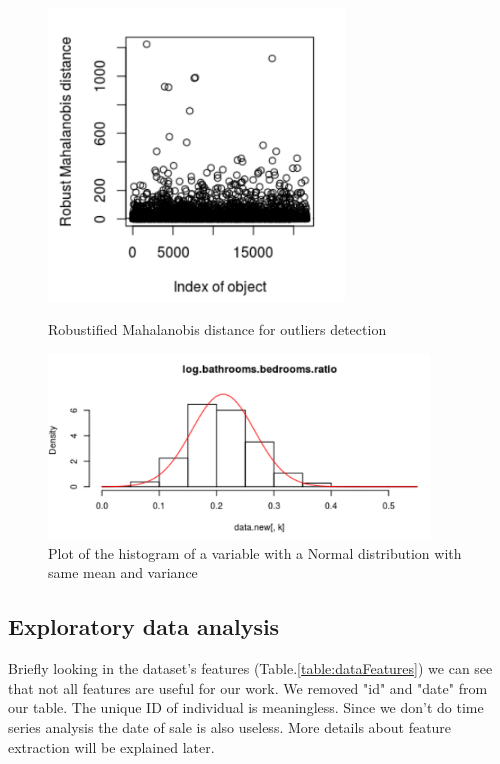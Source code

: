 \begin{figure}[H]
%
    \centering
        \includegraphics[width=0.7\textwidth]{img/mahalanobis.png}
    \caption{Robustified Mahalanobis distance for outliers detection }\label{mahalanobis}
\endminipage\hfill
{}%
    \centering
        \includegraphics[width=0.9\textwidth]{img/gauss01.png}
    \caption{Plot of the histogram of a variable with a Normal distribution with same mean and variance }\label{gauss01}
\endminipage
\end{figure}
\vspace*{-15pt}

\subsection{Exploratory data analysis}
Briefly looking in the dataset's features (Table.\ref{table:dataFeatures}) we can see that not all features are useful for our work. We removed "id" and "date" from our table. The unique ID of individual is meaningless. Since we don't do time series analysis the date of sale is also useless. More details about feature extraction will be explained later.

